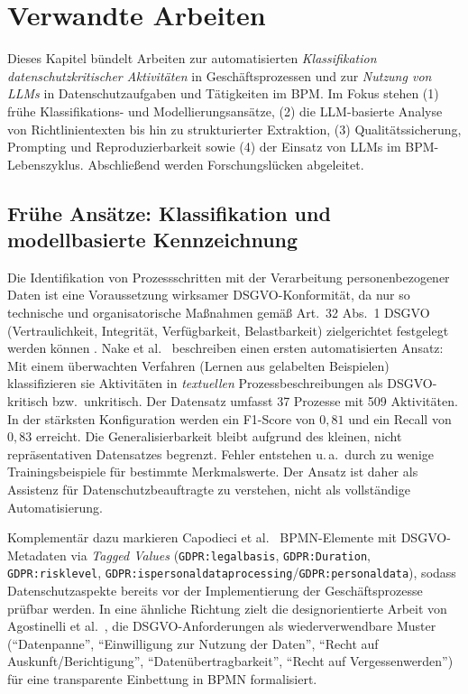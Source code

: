\section{Verwandte Arbeiten}\label{sec:verwandte-arbeiten}

Dieses Kapitel bündelt Arbeiten zur automatisierten \emph{Klassifikation datenschutzkritischer Aktivitäten} in Geschäftsprozessen und zur \emph{Nutzung von \acp{LLM}} in Datenschutzaufgaben und Tätigkeiten im \ac{BPM}. Im Fokus stehen (1) frühe Klassifikations- und Modellierungsansätze, (2) die \ac{LLM}-basierte Analyse von Richtlinientexten bis hin zu strukturierter Extraktion, (3) Qualitätssicherung, Prompting und Reproduzierbarkeit sowie (4) der Einsatz von \acp{LLM} im \ac{BPM}-Lebenszyklus. Abschließend werden Forschungslücken abgeleitet.

\subsection*{Frühe Ansätze: Klassifikation und modellbasierte Kennzeichnung}

Die Identifikation von Prozessschritten mit der Verarbeitung personenbezogener Daten ist eine Voraussetzung wirksamer \ac{DSGVO}-Konformität, da nur so technische und organisatorische Maßnahmen gemäß Art.~32 Abs.~1 \ac{DSGVO} (Vertraulichkeit, Integrität, Verfügbarkeit, Belastbarkeit) zielgerichtet festgelegt werden können \cite{GDPR2016}. Nake et al.\ \cite{nake2023towards} beschreiben einen ersten automatisierten Ansatz: Mit einem überwachten Verfahren (Lernen aus gelabelten Beispielen) klassifizieren sie Aktivitäten in \emph{textuellen} Prozessbeschreibungen als \ac{DSGVO}-kritisch bzw.\ unkritisch. Der Datensatz umfasst 37 Prozesse mit 509 Aktivitäten. In der stärksten Konfiguration werden ein F1-Score von $0{,}81$ und ein Recall von $0{,}83$ erreicht. Die Generalisierbarkeit bleibt aufgrund des kleinen, nicht repräsentativen Datensatzes begrenzt. Fehler entstehen u.\,a.\ durch zu wenige Trainingsbeispiele für bestimmte Merkmalswerte. Der Ansatz ist daher als Assistenz für Datenschutzbeauftragte zu verstehen, nicht als vollständige Automatisierung.

Komplementär dazu markieren Capodieci et al.\ \cite{Capodieci2023BPMNEnabledDP} \ac{BPMN}-Elemente mit \ac{DSGVO}-Metadaten via \emph{Tagged Values} (\texttt{GDPR:legalbasis}, \texttt{GDPR:Duration}, \texttt{GDPR:risklevel}, \texttt{GDPR:ispersonaldataprocessing}/\texttt{GDPR:personaldata}), sodass Datenschutzaspekte bereits vor der Implementierung der Geschäftsprozesse prüfbar werden. In eine ähnliche Richtung zielt die designorientierte Arbeit von Agostinelli et al.\ \cite{agostinelli2019achievingGDPRComliance}, die \ac{DSGVO}-Anforderungen als wiederverwendbare Muster (\enquote{Datenpanne}, \enquote{Einwilligung zur Nutzung der Daten}, \enquote{Recht auf Auskunft/Berichtigung}, \enquote{Datenübertragbarkeit}, \enquote{Recht auf Vergessenwerden}) für eine transparente Einbettung in \ac{BPMN} formalisiert.

